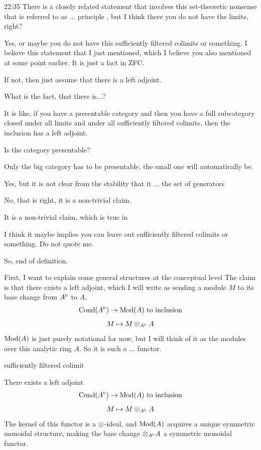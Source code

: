 \begin{unfinished}{22:35}
\scholze There is a closely related statement that involves this set-theoretic nonsense that is referred to as ... principle , but I think there you do not have the limits, right?

\clausen Yes, or maybe you do not have this sufficiently filtered colimits or something. I believe this statement that I just mentioned, which I believe you also mentioned at some point earlier. It is just a fact in ZFC.

\scholze If not, then just assume that there is a left adjoint.

\gabber What is the fact, that there is...?

\clausen It is like, if you have a presentable category and then you have a full subcategory closed under all limits and under all sufficiently filtered colimits, then the inclusion has a left adjoint. 

\gabber Is the category presentable?

\clausen Only the big category has to be presentable, the small one will automatically be.

\gabber Yes, but it is not clear from the stability that it ... the set of generators 

\clausen No, that is right, it is a non-trivial claim.


\gabber It is a non-trivial claim, which is true in 

\clausen I think it maybe implies you can leave out sufficiently filtered colimits or something. Do not quote me.

\scholze So, end of definition.

First, I want to explain some general structures at the conceptual level
The claim is that there exists a left adjoint, which I will write as sending a module $M$ to its base change from $A^\triangleright$ to $A$.
\begin{align*}
\mathrm{Cond}(A^\triangleright) \to \operatorname{Mod}(A) \text{ to inclusion}
\end{align*}
\begin{align*}
M \mapsto M \otimes_{A^\triangleright} A
\end{align*}
$\operatorname{Mod}(A)$ is just purely notational for now, but I will think of it as the modules over this analytic ring $A$. So it is such a ...  functor.

sufficiently filtered colimit

\bp
There exists a left adjoint
\begin{align*}
\mathrm{Cond}(A^\triangleright) \to \operatorname{Mod}(A) \text{ to inclusion}
\end{align*}
\begin{align*}
M \mapsto M \otimes_{A^\triangleright} A
\end{align*}
The kernel of this functor is a $\otimes$-ideal, and $\operatorname{Mod}(A)$ acquires a unique symmetric monoidal structure, making the base change $\otimes_{A^\triangleright} A$ a symmetric monoidal functor.
\ep



\end{unfinished}
